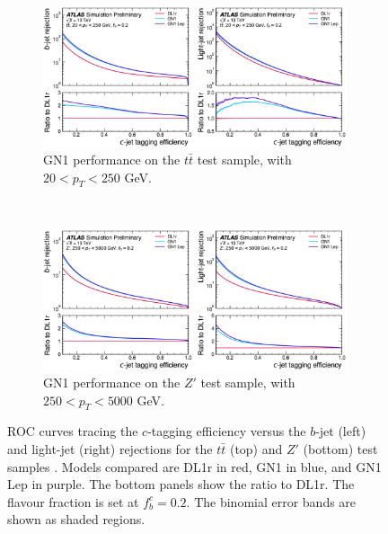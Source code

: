 \newpage
\vspace{-0.2cm}
\begin{figure}[h!]
  \centering
  \begin{subfigure}[b]{0.98\textwidth}
      \centering
      \includegraphics[width=0.98\textwidth]{Images/FTAG/GN/GN1/ROC/ttc.png}
      \caption{GN1 performance on the $t\bar{t}$ test sample, with $20 < p_T < 250$ GeV.} 
      \label{fig:GN1ttc}
  \end{subfigure}\\
  \begin{subfigure}[b]{0.98\textwidth}
    \centering
      \includegraphics[width=0.98\textwidth]{Images/FTAG/GN/GN1/ROC/zpc.png}
      \caption{GN1 performance on the $Z'$ test sample, with $250 < p_T < 5000$ GeV.} 
      \label{fig:GN1zpc}
  \end{subfigure}
  \caption{ROC curves tracing the $c$-tagging efficiency versus the $b$-jet (left) and light-jet (right) rejections for the $t\bar{t}$ (top) and $Z'$ (bottom) test samples \cite{ATL-PHYS-PUB-2022-027}. Models compared are DL1r in red, GN1 in blue, and GN1 Lep in purple. The bottom panels show the ratio to DL1r. The flavour fraction is set at $f^c_b = 0.2$. The binomial error bands are shown as shaded regions.}
  \label{fig:GN1rocc}
\end{figure} 


